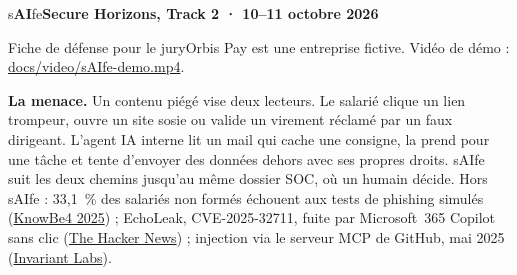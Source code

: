 \documentclass[7.6pt]{extarticle}
\newcommand{\cmd}[1]{{\ttfamily #1}}
\begin{document}
\fontsize{8.6}{10.2}\selectfont\raggedright\sloppy
{\Large s\textbf{AI}fe}\hfill{\bfseries\color{accent}Secure Horizons, Track 2 · 10--11 octobre 2026}\par
Fiche de défense pour le jury\hfill Orbis Pay est une entreprise fictive. Vidéo de démo : \href{video/sAIfe-demo.mp4}{\cmd{docs/video/sAIfe-demo.mp4}}.\par\vspace{1.5pt}

{\bfseries La menace.} Un contenu piégé vise deux lecteurs. Le salarié clique un lien trompeur, ouvre un site sosie ou valide un virement réclamé par un faux dirigeant. L’agent IA interne lit un mail qui cache une consigne, la prend pour une tâche et tente d’envoyer des données dehors avec ses propres droits. sAIfe suit les deux chemins jusqu’au même dossier SOC, où un humain décide. Hors sAIfe : 33,1~\% des salariés non formés échouent aux tests de phishing simulés (\href{https://www.knowbe4.com/resources/reports/2025-phishing-by-industry-benchmarking-report}{KnowBe4 2025}) ; EchoLeak, CVE-2025-32711, fuite par Microsoft~365 Copilot sans clic (\href{https://thehackernews.com/2025/06/zero-click-ai-vulnerability-exposes.html}{The Hacker News}) ; injection via le serveur MCP de GitHub, mai 2025 (\href{https://invariantlabs.ai/blog/mcp-github-vulnerability}{Invariant Labs}).
\end{document}
